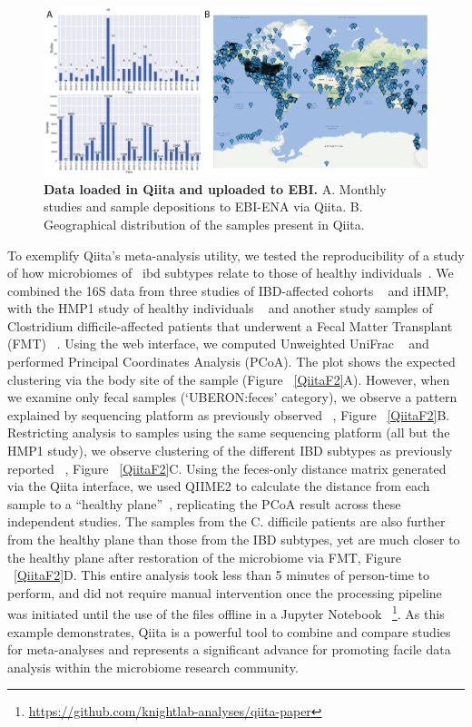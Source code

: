 \begin{figure}[htbp]
\includegraphics[width=\columnwidth]{chapter_qiita_figures/Figure_1.png}
\caption[Data loaded in Qiita and uploaded to EBI]{\textbf{Data loaded in Qiita and uploaded to EBI.} A. Monthly studies and sample
depositions to EBI-ENA via Qiita. B. Geographical distribution of the samples present in Qiita.}
\label{QiitaF1}
\end{figure}

To exemplify Qiita’s meta-analysis utility, we tested the reproducibility of a
study of how microbiomes of ~\gls{ibd} subtypes relate to those of healthy
individuals~\cite{Halfvarson2017}. We combined the 16S data from three studies
of IBD-affected cohorts ~\cite{Halfvarson2017,Gevers2014} and iHMP, with the HMP1
study of healthy individuals ~\cite{Consortium2012} and another study samples of
Clostridium difficile-affected patients that underwent a Fecal Matter Transplant
(FMT) ~\cite{Weingarden2015}. Using the web interface, we computed Unweighted
UniFrac ~\cite{Lozupone2005} and performed Principal Coordinates Analysis (PCoA).
The plot shows the expected clustering via the body site of the sample (Figure ~\ref{QiitaF2}A).
However, when we examine only fecal samples (‘UBERON:feces’ category), we observe a
pattern explained by sequencing platform as previously observed ~\cite{Lozupone2013}, Figure ~\ref{QiitaF2}B.
Restricting analysis to samples using the same sequencing platform (all but the HMP1 study),
we observe clustering of the different IBD subtypes as previously reported ~\cite{Halfvarson2017,Gevers2014},
Figure ~\ref{QiitaF2}C. Using the feces-only distance matrix generated via the Qiita interface,
we used QIIME2 to calculate the distance from each sample to a “healthy plane”~\cite{Halfvarson2017},
replicating the PCoA result across these independent studies. The samples from the C. difficile
patients are also further from the healthy plane than those from the IBD subtypes,
yet are much closer to the healthy plane after restoration of the microbiome via FMT,
Figure ~\ref{QiitaF2}D. This entire analysis took less than 5 minutes of person-time
to perform, and did not require manual intervention once the processing pipeline
was initiated until the use of the files offline in a Jupyter Notebook ~\footnote{\url{https://github.com/knightlab-analyses/qiita-paper}}.
As this example demonstrates, Qiita is a powerful tool to combine and compare
studies for meta-analyses and represents a significant advance for promoting
facile data analysis within the microbiome research community.

